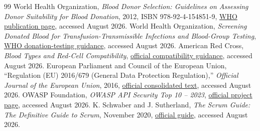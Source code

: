\begin{thebibliography}{99}
 World Health Organization, \emph{Blood Donor Selection: Guidelines on Assessing Donor Suitability for Blood Donation}, 2012, ISBN 978-92-4-154851-9, \href{https://www.who.int/publications/i/item/blood-donor-selection-guidelines-on-assessing-donor-suitability-for-blood-donation}{WHO publication page}, accessed August 2026.
 World Health Organization, \emph{Screening Donated Blood for Transfusion-Transmissible Infections and Blood-Group Testing}, \href{https://www.who.int/teams/health-product-policy-and-standards/standards-and-specifications/blood-and-products-of-human-origin/quality-and-safety/donation-testing}{WHO donation-testing guidance}, accessed August 2026.
 American Red Cross, \emph{Blood Types and Red-Cell Compatibility}, \href{https://www.redcrossblood.org/donate-blood/blood-types.html}{official compatibility guidance}, accessed August 2026.
 European Parliament and Council of the European Union, ``Regulation (EU) 2016/679 (General Data Protection Regulation),'' \emph{Official Journal of the European Union}, 2016, \href{https://eur-lex.europa.eu/legal-content/EN/TXT/PDF/?uri=CELEX:32016R0679}{official consolidated text}, accessed August 2026.
 OWASP Foundation, \emph{OWASP API Security Top 10 -- 2023}, \href{https://owasp.org/www-project-api-security/}{official project page}, accessed August 2026.
 K. Schwaber and J. Sutherland, \emph{The Scrum Guide: The Definitive Guide to Scrum}, November 2020, \href{https://scrumguides.org/docs/scrumguide/v2020/2020-Scrum-Guide-US.pdf}{official guide}, accessed August 2026.
\end{thebibliography}
